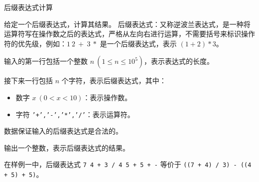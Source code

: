 后缀表达式计算

给定一个后缀表达式，计算其结果。
后缀表达式：又称逆波兰表达式，是一种将运算符写在操作数之后的表达式，严格从左向右进行运算，不需要括号来标识操作符的优先级，例如：$1 \ 2 \ + \ 3 \ *$ 是一个后缀表达式，表示 $(1 + 2) * 3$。

输入的第一行包括一个整数 $n \ (1 \leq n \leq 10^5)$，表示表达式的长度。

接下来一行包括 $n$ 个字符，表示后缀表达式，其中：
\begin{itemize}
    \item 数字 $x \ (0 < x < 10)$：表示操作数。
    \item 字符 \texttt{'+','-','*','/'}：表示运算符。
\end{itemize}

数据保证输入的后缀表达式是合法的。

输出一个整数，表示后缀表达式的结果。


在样例一中，后缀表达式 \texttt{7 4 + 3 / 4 5 + 5 + -} 等价于 \texttt{((7 + 4) / 3) - ((4 + 5) + 5)}。
